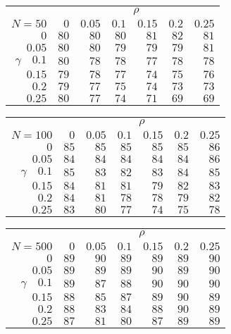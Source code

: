 \begin{tabular}{r|rrrrrr}
\hline\hline
 &\multicolumn{6}{c}{$\rho$} \\ 
 $N = 50$ & $0$ & $0.05$ & $0.1$ & $0.15$ & $0.2$ & $0.25$ \\ 
 \hline$0$ & $80$ & $80$ & $80$ & $81$ & $82$ & $81$\\ 
$0.05$ & $80$ & $80$ & $79$ & $79$ & $79$ & $81$\\ 
$\gamma\quad$$0.1$ & $80$ & $78$ & $78$ & $77$ & $78$ & $78$\\ 
$0.15$ & $79$ & $78$ & $77$ & $74$ & $75$ & $76$\\ 
$0.2$ & $79$ & $77$ & $75$ & $74$ & $73$ & $73$\\ 
$0.25$ & $80$ & $77$ & $74$ & $71$ & $69$ & $69$\\ 
 \hline 
 \end{tabular}
 
 \vspace{2em} 
 
\begin{tabular}{r|rrrrrr}
\hline\hline
 &\multicolumn{6}{c}{$\rho$} \\ 
 $N = 100$ & $0$ & $0.05$ & $0.1$ & $0.15$ & $0.2$ & $0.25$ \\ 
 \hline$0$ & $85$ & $85$ & $85$ & $85$ & $85$ & $86$\\ 
$0.05$ & $84$ & $84$ & $84$ & $84$ & $84$ & $86$\\ 
$\gamma\quad$$0.1$ & $85$ & $83$ & $82$ & $83$ & $84$ & $85$\\ 
$0.15$ & $84$ & $81$ & $81$ & $79$ & $82$ & $83$\\ 
$0.2$ & $84$ & $81$ & $78$ & $78$ & $79$ & $82$\\ 
$0.25$ & $83$ & $80$ & $77$ & $74$ & $75$ & $78$\\ 
 \hline 
 \end{tabular}
 
 \vspace{2em} 
 
\begin{tabular}{r|rrrrrr}
\hline\hline
 &\multicolumn{6}{c}{$\rho$} \\ 
 $N = 500$ & $0$ & $0.05$ & $0.1$ & $0.15$ & $0.2$ & $0.25$ \\ 
 \hline$0$ & $89$ & $90$ & $89$ & $89$ & $89$ & $90$\\ 
$0.05$ & $89$ & $89$ & $89$ & $90$ & $89$ & $90$\\ 
$\gamma\quad$$0.1$ & $89$ & $87$ & $88$ & $90$ & $90$ & $90$\\ 
$0.15$ & $88$ & $85$ & $87$ & $89$ & $90$ & $89$\\ 
$0.2$ & $88$ & $83$ & $84$ & $88$ & $90$ & $89$\\ 
$0.25$ & $87$ & $81$ & $80$ & $87$ & $89$ & $89$\\ 
 \hline 
 \end{tabular}